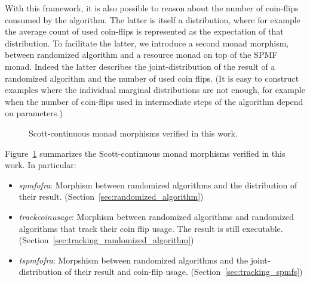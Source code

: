 \documentclass[11pt,a4paper]{article}
\begin{document}
With this framework, it is also possible to reason about the number of coin-flips consumed by the
algorithm. The latter is itself a distribution, where for example the average count of used
coin-flips is represented as the expectation of that distribution. To facilitate the latter, we 
introduce a second monad morphism, between randomized algorithm and a resource monad on top of the
SPMF monad. Indeed the latter describes the joint-distribution of the result of a randomized
algorithm and the number of used coin flips. (It is easy to construct examples where the 
individual marginal distributions are not enough, for example when the number of coin-flips used in
intermediate steps of the algorithm depend on parameters.)

\begin{figure}
\centering
{}
\caption{Scott-continuous monad morphisms verified in this work.}
\label{fig:morphisms}
\end{figure}

Figure~\ref{fig:morphisms} summarizes the Scott-continuous monad morphisms verified in this work.
In particular:

\begin{itemize}
\item \emph{spmf{\isacharunderscore}of{\isacharunderscore}ra}: Morphism between randomized 
algorithms and the distribution of their result. (Section~\ref{sec:randomized_algorithm})
\item \emph{track{\isacharunderscore}coin{\isacharunderscore}usage}: Morphism between randomized algorithms and randomized algorithms
that track their coin flip usage. The result is still executable. (Section~\ref{sec:tracking_randomized_algorithm})
\item \emph{tspmf{\isacharunderscore}of{\isacharunderscore}ra}: Morpshism between randomized
algorithms and the joint-distribution of their result and coin-flip usage. 
(Section~\ref{sec:tracking_spmfs})
\end{itemize}
\end{document}
